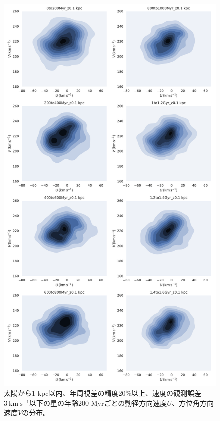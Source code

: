 \begin{figure}[htbp]
\begin{center}
	\includegraphics[width=12cm]{fig/UV/hist_seaborn_1_z0.1kpc.pdf}
	\caption{太陽から1 kpc以内、年周視差の精度20\%以上、速度の観測誤差$3\ \mathrm{km\ s^{-1}}$以下の星の年齢200 Myrごとの動径方向速度$U$、方位角方向速度$V$の分布。}
	\label{hist_seaborn_200Myr}
\end{center}
\end{figure}

